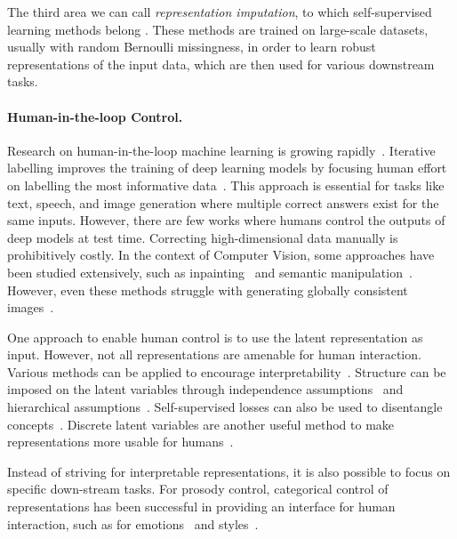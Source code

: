 \documentclass[../thesis.tex]{subfiles}
\begin{document}
The third area we can call \textit{representation imputation}, to which self-supervised learning methods belong \citep{heMaskedAutoencodersAre2022, tangSelfsupervisedLearningDataefficient2024}. These methods are trained on large-scale datasets, usually with random Bernoulli missingness, in order to learn robust representations of the input data, which are then used for various downstream tasks.

\paragraph{Human-in-the-loop Control.} Research on human-in-the-loop machine learning is growing rapidly~\citep{wuSurveyHumanintheloopMachine2022}. Iterative labelling improves the training of deep learning models by focusing human effort on labelling the most informative data~\citep{xinAcceleratingHumanintheloopMachine2018,chaiHumanintheloopTechniquesMachine2020}. This approach is essential for tasks like text, speech, and image generation where multiple correct answers exist for the same inputs. However, there are few works where humans control the outputs of deep models at test time. Correcting high-dimensional data manually is prohibitively costly. In the context of Computer Vision, some approaches have been studied extensively, such as inpainting~\citep{elharroussImageInpaintingReview2020} and semantic manipulation~\citep{park2019semantic}. However, even these methods struggle with generating globally consistent images~\citep{zhangCoherentImageInpainting2023}.

One approach to enable human control is to use the latent representation as input. However, not all representations are amenable for human interaction. Various methods can be applied to encourage interpretability~\citep{tschannenRecentAdvancesAutoencoderBased2018}. Structure can be imposed on the latent variables through independence assumptions~\citep{anEffectiveDirectControl2021} and hierarchical assumptions~\citep{hsuHierarchicalGenerativeModeling2019}. Self-supervised losses can also be used to disentangle concepts~\citep{sunFullyhierarchicalFinegrainedProsody2020}. Discrete latent variables are another useful method to make representations more usable for humans~\citep{vandenoordNeuralDiscreteRepresentation2017}.

Instead of striving for interpretable representations, it is also possible to focus on specific down-stream tasks. For prosody control, categorical control of representations has been successful in providing an interface for human interaction, such as for emotions~\citep{schroderEmotionalSpeechSynthesis2001} and styles~\citep{prateekOtherNewsBistyle2019}.
\end{document}
